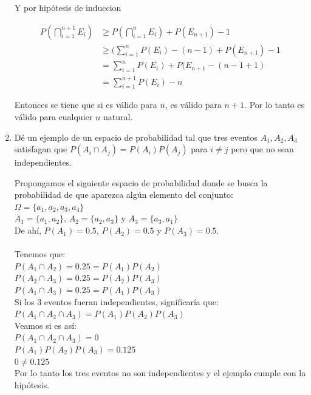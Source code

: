 \documentclass[12pt,a4paper]{report}
\begin{document}
\begin{enumerate}
{\begin{enumerate}[label=\alph*) ]
{	Y por hipótesis de induccion

	\begin{align*}
		P(\bigcap\limits_{i=1}^{n+1} E_{i}) &\geq P(\bigcap\limits_{i=1}^{n} E_{i}) + P(E_{n+1}) - 1\\
																				&\geq (\sum_{i=1}^{n} P(E_{i})-(n-1) + P(E_{n+1}) - 1\\
																				&=\sum_{i=1}^{n} P(E_{i}) + P(E_{n+1} -(n-1+1)\\
																				&= \sum_{i=1}^{n+1} P(E_{i})- n
	\end{align*}

	Entonces se tiene que si es válido para $n$, es válido para $n+1$.
	Por lo tanto es válido para cualquier $n$ natural.

   }




	\end{enumerate}
	}

  \item{
  Dé un ejemplo de un espacio de probabilidad tal que tres eventos $A_{1},A_{2},A_{3}$ satisfagan que $P(A_{i} \cap A_{j})=P(A_{i})P(A_{j})$ para $i\neq j$ pero que no sean independientes.

  Propongamos el siguiente espacio de probabilidad donde se busca la probabilidad de que aparezca algún elemento del conjunto:\\
  $\Omega = \lbrace a_{1}, a_{2}, a_{3}, a_{4} \rbrace$\\
  $A_{1} = \lbrace a_{1}, a_{2} \rbrace$, $A_{2} = \lbrace a_{2}, a_{3} \rbrace$ y $A_{3} =  \lbrace a_{3}, a_{1} \rbrace$\\
  De ahí, $P(A_{1}) = 0.5$, $P(A_{2}) = 0.5$ y $P(A_{3}) = 0.5$.\\\\
  Tenemos que:\\
  $P(A_{1} \cap A_{2}) = 0.25 = P(A_{1})P(A_{2})$\\
  $P(A_{2} \cap A_{3}) = 0.25 = P(A_{2})P(A_{3})$\\
  $P(A_{1} \cap A_{3}) = 0.25 = P(A_{1})P(A_{3})$\\

  Si los 3 eventos fueran independientes, significaría que: \\$P(A_{1} \cap A_{2} \cap A_{3}) = P(A_{1})P(A_{2})P(A_{3})$\\
  Veamos si es así:\\
  $P(A_{1} \cap A_{2} \cap A_{3}) = 0$\\
  $P(A_{1})P(A_{2})P(A_{3}) = 0.125$\\
  $ 0  \neq 0.125$ \\
  Por lo tanto los tres eventos no son independientes y el ejemplo cumple con la hipótesis.\\
  }



\end{enumerate}
\end{document}
